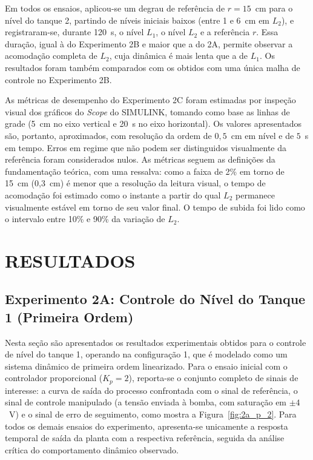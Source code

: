 \documentclass[a4paper,12pt]{article}
\begin{document}
\begin{justify}
    \hspace{4ex}Em todos os ensaios, aplicou-se um degrau de referência de $r = 15$~cm para o nível do tanque 2, partindo de níveis iniciais baixos (entre 1 e 6~cm em $L_2$), e registraram-se, durante 120~s, o nível $L_1$, o nível $L_2$ e a referência $r$. Essa duração, igual à do Experimento 2B e maior que a do 2A, permite observar a acomodação completa de $L_2$, cuja dinâmica é mais lenta que a de $L_1$. Os resultados foram também comparados com os obtidos com uma única malha de controle no Experimento 2B.
\end{justify}

\begin{justify}
    \hspace{4ex}As métricas de desempenho do Experimento 2C foram estimadas por inspeção visual dos gráficos do \textit{Scope} do SIMULINK, tomando como base as linhas de grade (5~cm no eixo vertical e 20~s no eixo horizontal). Os valores apresentados são, portanto, aproximados, com resolução da ordem de $0{,}5$~cm em nível e de $5$~s em tempo. Erros em regime que não podem ser distinguidos visualmente da referência foram considerados nulos. As métricas seguem as definições da fundamentação teórica, com uma ressalva: como a faixa de 2\% em torno de 15~cm (0,3~cm) é menor que a resolução da leitura visual, o tempo de acomodação foi estimado como o instante a partir do qual $L_2$ permanece visualmente estável em torno de seu valor final. O tempo de subida foi lido como o intervalo entre 10\% e 90\% da variação de $L_2$.
\end{justify}

\newpage


\thispagestyle{main}

\section{RESULTADOS}

\subsection{Experimento 2A: Controle do Nível do Tanque 1 (Primeira Ordem)}

\begin{justify}
    \hspace{4ex}Nesta seção são apresentados os resultados experimentais obtidos para o controle de nível do tanque 1, operando na configuração 1, que é modelado como um sistema dinâmico de primeira ordem linearizado. Para o ensaio inicial com o controlador proporcional ($K_p = 2$), reporta-se o conjunto completo de sinais de interesse: a curva de saída do processo confrontada com o sinal de referência, o sinal de controle manipulado (a tensão enviada à bomba, com saturação em $\pm 4$~V) e o sinal de erro de seguimento, como mostra a Figura~\ref{fig:2a_p_2}. Para todos os demais ensaios do experimento, apresenta-se unicamente a resposta temporal de saída da planta com a respectiva referência, seguida da análise crítica do comportamento dinâmico observado.
\end{justify}
\end{document}
